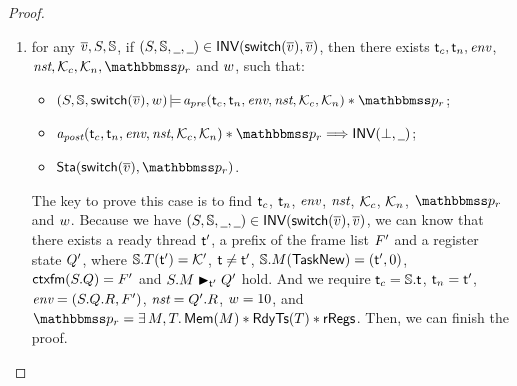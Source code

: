 \begin{proof}
\begin{enumerate}
        \item for any $\overline{v}, S, \mathbb{S}$, 
        if $(S, \mathbb{S}, \underline{\ \,}, \underline{\ \,}) \in 
            \textsf{INV}{(\mathsf{switch}(\overline{v}), \overline{v})}$, 
        then there exists $\textsf{t}_c, \textsf{t}_n, \textit{env}$, $\nst, 
        \hthrdlocalst_c, \hthrdlocalst_n, \relastP_r$ and $w$, 
        such that:
        \begin{itemize}
            \item $\asrtmodel{(\state, \hpstate, \primsw(\args{\val}), \word)}
                {\Apre(\thrdid_c, \thrdid_n, \env, \nst, \hthrdlocalst_c, 
                \hthrdlocalst_n) \sepstar \relastP_r}$; 
            \item  $\Apost(\thrdid_c, \thrdid_n, \env, \nst, \hthrdlocalst_c, 
                \hthrdlocalst_n) \sepstar \relastP_r \Longrightarrow 
                \INV{(\primdone, \notCare)}$; 
            \item $\Sta(\primsw(\args{\val}), \relastP_r)$. 
        \end{itemize}
        \vspace*{0.3em}
        The key to prove this case is to find $\textsf{t}_c$, $\textsf{t}_n$, $\textit{env}$, 
        $\textit{nst}$, $\mathcal{K}_c$, $\mathcal{K}_n$, $\relastP_r$ and $w$. 
        Because we have $(S, \mathbb{S}, \underline{\ \,}, \underline{\ \,}) \in 
            \textsf{INV}{(\mathsf{switch}(\overline{v}), \overline{v})}$, we can know that there exists 
        a ready thread $\textsf{t}'$, a prefix of the frame list $F'$ 
        and a register state $Q'$, where 
        $\mathbb{S}.T(\textsf{t}') = \mathcal{K}'$, 
        $\textsf{t} \neq \textsf{t}'$, $\mathbb{S}.M(\mathsf{TaskNew}) = (\textsf{t}', 0)$, 
        $\textsf{ctxfm}(S.Q) = F'$ 
        and ${S.M} \blacktriangleright_{\textsf{t}'} {Q'}$ hold. 
        And we require $\textsf{t}_c = \mathbb{S}.\textsf{t}$, $\textsf{t}_n = \textsf{t}'$, 
        $\textit{env} = (S.Q.R, F')$, $\textit{nst} = Q'.R$, $w = 10$, 
        and $\relastP_r = \exists \, \Mem, \thrdpool. \, \MemRAsrt{\Mem}
        \sepstar \RdyTsRAsrt{\thrdpool} \sepstar \rRegs$. Then, we can finish 
        the proof. 


\end{enumerate}
\end{proof}
